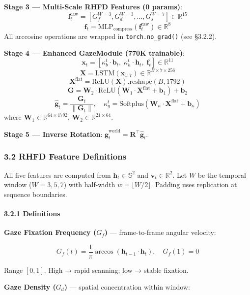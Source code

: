 \documentclass[
]{article}
\begin{document}
\textbf{Stage 3 --- Multi-Scale RHFD Features (0 params)}:
\[\mathbf{f}_t^{\text{raw}} = [G_f^{W=3}, G_d^{W=3}, \ldots, G_s^{W=7}] \in \mathbb{R}^{15}\]
\[\mathbf{f}_t = \text{MLP}_{\text{compress}}(\mathbf{f}_t^{\text{raw}}) \in \mathbb{R}^{8}\]
All arccosine operations are wrapped in \texttt{torch.no\_grad()} (see
§3.2.2).

\textbf{Stage 4 --- Enhanced GazeModule (770K trainable)}:
\[\mathbf{x}_t = [\kappa_b^t \cdot \mathbf{b}_t,\; \kappa_h^t \cdot \mathbf{h}_t,\; \mathbf{f}_t] \in \mathbb{R}^{11}\]
\[\mathbf{X} = \text{LSTM}(\mathbf{x}_{1:7}) \in \mathbb{R}^{B \times 7 \times 256}\]
\[\mathbf{X}^{\text{flat}} = \text{ReLU}(\mathbf{X}).\text{reshape}(B, 1792)\]
\[\mathbf{G} = \mathbf{W}_2 \cdot \text{ReLU}(\mathbf{W}_1 \cdot \mathbf{X}^{\text{flat}} + \mathbf{b}_1) + \mathbf{b}_2\]
\[\hat{\mathbf{g}}_t = \frac{\mathbf{G}_t}{\|\mathbf{G}_t\|}, \quad \kappa_g^t = \text{Softplus}(\mathbf{W}_\kappa \cdot \mathbf{X}^{\text{flat}} + \mathbf{b}_\kappa)\]
where \(\mathbf{W}_1 \in \mathbb{R}^{64 \times 1792}\),
\(\mathbf{W}_2 \in \mathbb{R}^{21 \times 64}\).

\textbf{Stage 5 --- Inverse Rotation}:
\(\hat{\mathbf{g}}_t^{\text{world}} = \mathbf{R}^\top \hat{\mathbf{g}}_t\).

\hypertarget{rhfd-feature-definitions}{%
\subsubsection{3.2 RHFD Feature
Definitions}\label{rhfd-feature-definitions}}

All five features are computed from \(\mathbf{h}_t \in \mathbb{S}^2\)
and \(\mathbf{v}_t \in \mathbb{R}^2\). Let \(W\) be the temporal window
(\(W=3,5,7\)) with half-width \(w = \lfloor W/2 \rfloor\). Padding uses
replication at sequence boundaries.

\hypertarget{definitions}{%
\paragraph{3.2.1 Definitions}\label{definitions}}

\textbf{Gaze Fixation Frequency (\(G_f\))} --- frame-to-frame angular
velocity:

\[G_f(t) = \frac{1}{\pi} \arccos(\mathbf{h}_{t-1} \cdot \mathbf{h}_t), \quad G_f(1) = 0\]

Range \([0, 1]\). High → rapid scanning; low → stable fixation.

\textbf{Gaze Density (\(G_d\))} --- spatial concentration within window:
\end{document}
